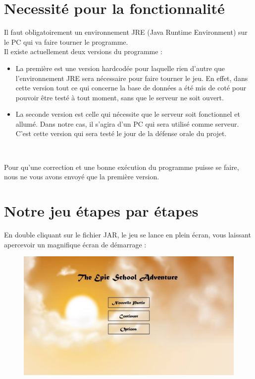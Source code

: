 \documentclass[a4paper,titlepage]{article}
\begin{document}
	\section{Necessité pour la fonctionnalité}
	Il faut obligatoirement un environnement JRE (Java Runtime Environment) sur le PC qui va faire tourner le programme.\\
	
	Il existe actuellement deux versions du programme : 
	\begin{itemize}
		\item La première est une version \og hardcodée \fg{} pour laquelle rien d'autre que l'environnement JRE sera nécessaire pour faire tourner le jeu. En effet, dans cette version tout ce qui concerne la base de données a été mis de coté pour pouvoir être testé à tout moment, sans que le serveur ne soit ouvert.
		\item La seconde version est celle qui nécessite que le serveur soit fonctionnel et allumé. Dans notre cas, il s'agira d'un PC qui sera utilisé comme serveur. C'est cette version qui sera testé le jour de la défense orale du projet.
	\end{itemize}
	\
	
	Pour qu'une correction et une bonne exécution du programme puisse se faire, nous ne vous avons envoyé que la première version.
	\clearpage
	
	\section{Notre jeu étapes par étapes}
	En double cliquant sur le fichier JAR, le jeu se lance en plein écran, vous laissant apercevoir un magnifique écran de démarrage :
	\begin{figure}[h!]
		\includegraphics[scale=0.30]{EcranDebut.jpg}
	\end{figure}
	
\end{document}
